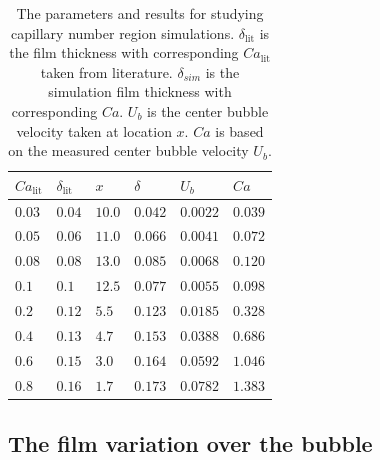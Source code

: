 \documentclass{article}
\begin{document}
\begin{table}
\begin{tabularx}{\textwidth}{|X|X|X|X|X|X|}
\hline
$Ca_{\mathrm{lit}}$&$\delta_{\mathrm{lit}}$&$x$&$\delta$&$U_b$&$Ca$\\
\hline
$0.03$&$0.04$&$10.0$&$0.042$&$0.0022$&$0.039$\\
\hline
$0.05$&$0.06$&$11.0$&$0.066$&$0.0041$&$0.072$\\
\hline
$0.08$&$0.08$&$13.0$&$0.085$&$0.0068$&$0.120$\\
\hline
$0.1$&$0.1$&$12.5$&$0.077$&$0.0055$&$0.098$\\
\hline
$0.2$&$0.12$&$5.5$&$0.123$&$0.0185$&$0.328$\\
\hline
$0.4$&$0.13$&$4.7$&$0.153$&$0.0388$&$0.686$\\
\hline
$0.6$&$0.15$&$3.0$&$0.164$&$0.0592$&$1.046$\\
\hline
$0.8$&$0.16$&$1.7$&$0.173$&$0.0782$&$1.383$\\
\hline
\end{tabularx}
\caption{The parameters and results for studying capillary number region simulations.
$\delta_{\mathrm{lit}}$ is the film thickness with corresponding $Ca_{\mathrm{lit}}$ taken from
literature. $\delta_{sim}$ is the simulation film thickness with corresponding $Ca$. $U_b$ is the
center bubble velocity taken at location $x$. $Ca$ is based on the measured center bubble velocity
$U_{b}$.
\label{table:parameters:capillary:number}}
\end{table}



\subsection{The film variation over the bubble}
\end{document}

